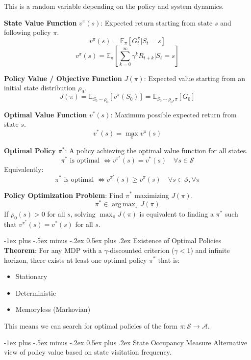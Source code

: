 \documentclass[10pt,landscape]{article}
\makeatletter
\DeclareMathOperator*{\argmax}{arg\,max}
\renewcommand{\section}{\@startsection{section}{1}{0mm}%
                                {-1ex plus -.5ex minus -.2ex}%
                                {0.5ex plus .2ex}%
                                {\normalfont\large\bfseries}}
\renewcommand{\subsection}{\@startsection{subsection}{2}{0mm}%
                                {-1ex plus -.5ex minus -.2ex}%
                                {0.5ex plus .2ex}%
                                {\normalfont\normalsize\bfseries}}
\makeatother
\begin{document}
\begin{multicols}{3}
    This is a random variable depending on the policy and system dynamics.

    \textbf{State Value Function} $v^\pi(s)$: Expected return starting from state $s$ and following policy $\pi$.
    $$ v^\pi(s) = \mathbb{E}_\pi [ G^\pi_t | S_t = s ] $$
    $$ v^\pi(s) = \mathbb{E}_\pi \left[ \sum_{k=0}^\infty \gamma^k R_{t+k} \bigg| S_t = s \right] $$

    \textbf{Policy Value / Objective Function} $J(\pi)$: Expected value starting from an initial state distribution $\rho_0$.
    $$ J(\pi) = \mathbb{E}_{S_0 \sim \rho_0} [ v^\pi(S_0) ] = \mathbb{E}_{S_0 \sim \rho_0, \pi} [ G_0 ] $$

    \textbf{Optimal Value Function} $v^*(s)$: Maximum possible expected return from state $s$.
    $$ v^*(s) = \max_\pi v^\pi(s) $$

    \textbf{Optimal Policy} $\pi^*$: A policy achieving the optimal value function for all states.
    $$ \pi^* \text{ is optimal } \iff v^{\pi^*}(s) = v^*(s) \quad \forall s \in \mathcal{S} $$
    Equivalently:
    $$ \pi^* \text{ is optimal } \iff v^{\pi^*}(s) \ge v^\pi(s) \quad \forall s \in \mathcal{S}, \forall \pi $$

    \textbf{Policy Optimization Problem}: Find $\pi^*$ maximizing $J(\pi)$.
    $$ \pi^* \in \argmax_\pi J(\pi) $$
    If $\rho_0(s) > 0$ for all $s$, solving $\max_\pi J(\pi)$ is equivalent to finding a $\pi^*$ such that $v^{\pi^*}(s) = v^*(s)$ for all $s$.

    \subsection{Existence of Optimal Policies}
    \textbf{Theorem}: For any MDP with a $\gamma$-discounted criterion ($\gamma < 1$) and infinite horizon, there exists at least one optimal policy $\pi^*$ that is:
    \begin{itemize}[label={--},leftmargin=4mm, itemsep=-.4mm]
        \item Stationary
        \item Deterministic
        \item Memoryless (Markovian)
    \end{itemize}
    This means we can search for optimal policies of the form $\pi: \mathcal{S} \to \mathcal{A}$.

    \section{State Occupancy Measure}
    Alternative view of policy value based on state visitation frequency.


\end{multicols}
\end{document}
